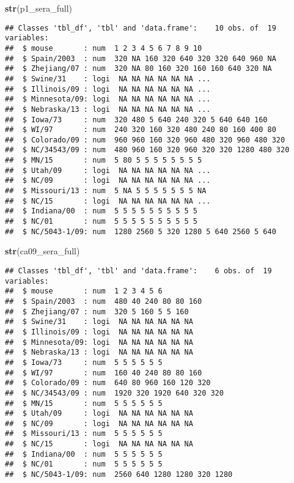 \documentclass[]{article}
\newenvironment{Shaded}{\begin{snugshade}}{\end{snugshade}}
\newcommand{\KeywordTok}[1]{\textcolor[rgb]{0.13,0.29,0.53}{\textbf{#1}}}
\newcommand{\NormalTok}[1]{#1}
\begin{document}
\begin{Shaded}
\begin{Highlighting}[]
\KeywordTok{str}\NormalTok{(p1_sera_full)}
\end{Highlighting}
\end{Shaded}

\begin{verbatim}
## Classes 'tbl_df', 'tbl' and 'data.frame':    10 obs. of  19 variables:
##  $ mouse       : num  1 2 3 4 5 6 7 8 9 10
##  $ Spain/2003  : num  320 NA 160 320 640 320 320 640 960 NA
##  $ Zhejiang/07 : num  320 NA 80 160 320 160 160 640 320 NA
##  $ Swine/31    : logi  NA NA NA NA NA NA ...
##  $ Illinois/09 : logi  NA NA NA NA NA NA ...
##  $ Minnesota/09: logi  NA NA NA NA NA NA ...
##  $ Nebraska/13 : logi  NA NA NA NA NA NA ...
##  $ Iowa/73     : num  320 480 5 640 240 320 5 640 640 160
##  $ WI/97       : num  240 320 160 320 480 240 80 160 400 80
##  $ Colorado/09 : num  960 960 160 320 960 480 320 960 480 320
##  $ NC/34543/09 : num  480 960 160 320 960 320 320 1280 480 320
##  $ MN/15       : num  5 80 5 5 5 5 5 5 5 5
##  $ Utah/09     : logi  NA NA NA NA NA NA ...
##  $ NC/09       : logi  NA NA NA NA NA NA ...
##  $ Missouri/13 : num  5 NA 5 5 5 5 5 5 5 NA
##  $ NC/15       : logi  NA NA NA NA NA NA ...
##  $ Indiana/00  : num  5 5 5 5 5 5 5 5 5 5
##  $ NC/01       : num  5 5 5 5 5 5 5 5 5 5
##  $ NC/5043-1/09: num  1280 2560 5 320 1280 5 640 2560 5 640
\end{verbatim}

\begin{Shaded}
\begin{Highlighting}[]
\KeywordTok{str}\NormalTok{(ca09_sera_full)}
\end{Highlighting}
\end{Shaded}

\begin{verbatim}
## Classes 'tbl_df', 'tbl' and 'data.frame':    6 obs. of  19 variables:
##  $ mouse       : num  1 2 3 4 5 6
##  $ Spain/2003  : num  480 40 240 80 80 160
##  $ Zhejiang/07 : num  320 5 160 5 5 160
##  $ Swine/31    : logi  NA NA NA NA NA NA
##  $ Illinois/09 : logi  NA NA NA NA NA NA
##  $ Minnesota/09: logi  NA NA NA NA NA NA
##  $ Nebraska/13 : logi  NA NA NA NA NA NA
##  $ Iowa/73     : num  5 5 5 5 5 5
##  $ WI/97       : num  160 40 240 80 80 160
##  $ Colorado/09 : num  640 80 960 160 120 320
##  $ NC/34543/09 : num  1920 320 1920 640 320 320
##  $ MN/15       : num  5 5 5 5 5 5
##  $ Utah/09     : logi  NA NA NA NA NA NA
##  $ NC/09       : logi  NA NA NA NA NA NA
##  $ Missouri/13 : num  5 5 5 5 5 5
##  $ NC/15       : logi  NA NA NA NA NA NA
##  $ Indiana/00  : num  5 5 5 5 5 5
##  $ NC/01       : num  5 5 5 5 5 5
##  $ NC/5043-1/09: num  2560 640 1280 1280 320 1280
\end{verbatim}
\end{document}
